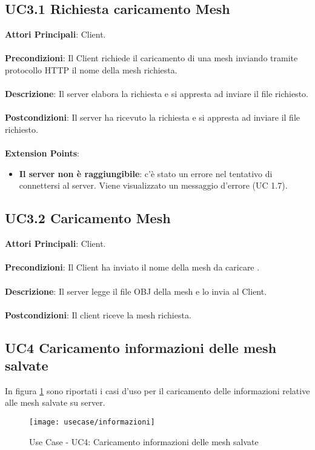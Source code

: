 \subsection{UC3.1 Richiesta caricamento Mesh}
\textbf{Attori Principali}: Client.
\\\\ \textbf{Precondizioni}: Il Client richiede il caricamento di una mesh inviando tramite protocollo HTTP il nome della mesh richiesta.
\\\\ \textbf{Descrizione}: Il server elabora la richiesta e si appresta ad inviare il file richiesto.
\\\\ \textbf{Postcondizioni}: Il server ha ricevuto la richiesta e si appresta ad inviare il file richiesto.
\\\\ \textbf{Extension Points}:
\begin{itemize}
\item \textbf{Il server non è raggiungibile}: c'è stato un errore nel tentativo di connettersi al server. Viene visualizzato un messaggio d'errore (UC 1.7).
\end{itemize}

\subsection{UC3.2 Caricamento Mesh}
\textbf{Attori Principali}: Client.
\\\\ \textbf{Precondizioni}: Il Client ha inviato il nome della mesh da caricare .
\\\\ \textbf{Descrizione}: Il server legge il file OBJ della mesh e lo invia al Client.
\\\\ \textbf{Postcondizioni}: Il client riceve la mesh richiesta.


\subsection{UC4 Caricamento informazioni delle mesh salvate}
In figura \ref{fig:loadinfo} sono riportati i casi d'uso per il caricamento delle informazioni relative alle mesh salvate su server.
\begin{figure}[!h] 
    \centering 
    \texttt{[image: usecase/informazioni]} 
    \caption{Use Case - UC4: Caricamento informazioni delle mesh salvate}
    \label{fig:loadinfo}
\end{figure}

